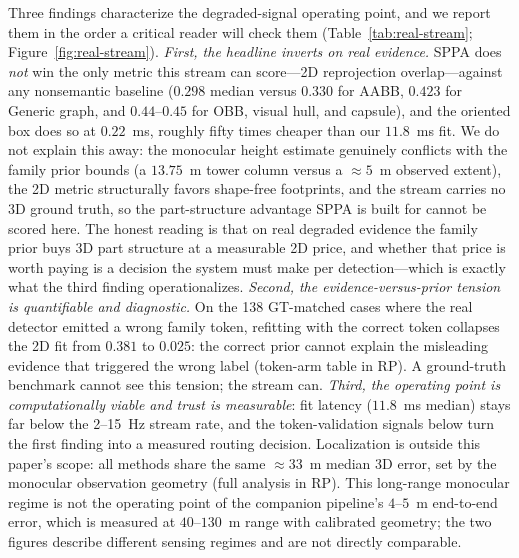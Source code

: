 \documentclass[11pt,a4paper]{article}
\begin{document}
Three findings characterize the degraded-signal operating point, and we
report them in the order a critical reader will check them
(Table~\ref{tab:real-stream}; Figure~\ref{fig:real-stream}). \emph{First, the
headline inverts on real evidence.} SPPA does \emph{not} win the only metric
this stream can score---2D reprojection overlap---against any nonsemantic
baseline (\(0.298\) median versus \(0.330\) for AABB, \(0.423\) for Generic
graph, and \(0.44\)--\(0.45\) for OBB, visual hull, and capsule), and the oriented box
does so at \(0.22\)~ms, roughly fifty times cheaper than our \(11.8\)~ms
fit. We do not explain this away: the monocular height estimate genuinely
conflicts with the family prior bounds (a \(13.75\)~m tower column versus a
\(\approx\)\(5\)~m observed extent), the 2D metric structurally favors
shape-free footprints, and the stream carries no 3D ground truth, so the
part-structure advantage SPPA is built for cannot be scored here. The honest
reading is that on real degraded evidence the family prior buys 3D part
structure at a measurable 2D price, and whether that price is worth paying
is a decision the system must make per detection---which is exactly what the
third finding operationalizes. \emph{Second, the evidence-versus-prior
tension is quantifiable and diagnostic.} On the 138 GT-matched cases where
the real detector emitted a wrong family token, refitting with the correct
token collapses the 2D fit from \(0.381\) to \(0.025\): the correct prior
cannot explain the misleading evidence that triggered the wrong label
(token-arm table in RP). A ground-truth benchmark cannot see this tension;
the stream can. \emph{Third, the operating point is computationally viable
and trust is measurable}: fit latency (\(11.8\)~ms median) stays far below
the 2--15~Hz stream rate, and the token-validation signals below turn the
first finding into a measured routing decision. Localization is outside this
paper's scope: all methods share the same \(\approx\)\(33\)~m median 3D
error, set by the monocular observation geometry (full analysis in RP). This
long-range monocular regime is not the operating point of the companion
pipeline's \(4\)--\(5\)~m end-to-end error, which is measured at
\(40\)--\(130\)~m range with calibrated geometry; the two figures describe
different sensing regimes and are not directly comparable.
\end{document}
